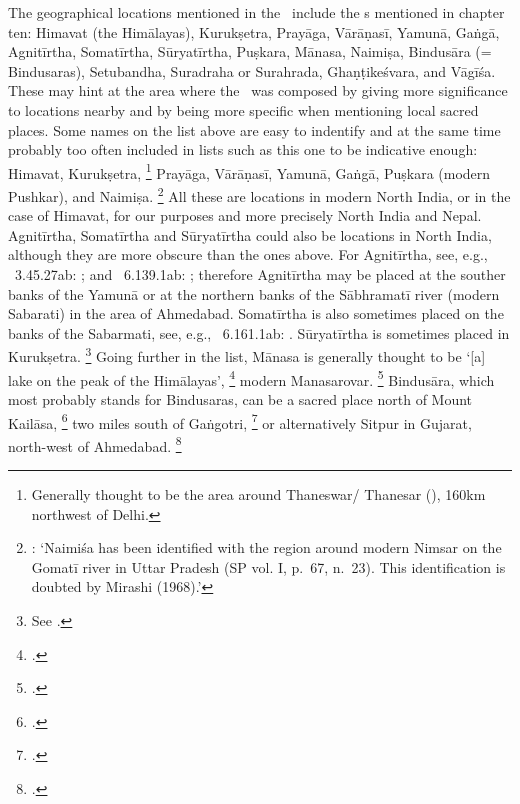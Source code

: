 The geographical locations 
mentioned in the \VSS\ include the
s mentioned in chapter ten:
Himavat (the Himālayas),
Kurukṣetra,
Prayāga,
Vārāṇasī,
Yamunā,
Gaṅgā,
Agnitīrtha, %
Somatīrtha, %
Sūryatīrtha, %
Puṣkara, %
Mānasa, %
Naimiṣa, %
Bindusāra (= Bindusaras), %
Setubandha, %
Suradraha or Sura\-hrada, %
Ghaṇṭikeśvara,
and Vāgīśa.
These may hint at the area where the \VSS\ was
composed by giving more significance to 
locations nearby and by being more specific when
mentioning local sacred places.
Some names on the list above are 
easy to indentify and at the same
time probably too often included in lists such as this one
to be indicative enough: 
Himavat, Kurukṣetra,%
	\footnote{Generally thought to be the area
		around Thaneswar\thinspace /\thinspace
		Thanesar (), 
		160km northwest of Delhi.}	
Prayāga, Vārāṇasī, Yamunā,
Gaṅgā, Puṣkara (modern Pushkar), and Naimiṣa.%
		\footnote{: 
		`Naimiśa has been identified with the region around 
		modern Nimsar on the Gomatī river in Uttar Pradesh 			(SP vol. I, p.~67, n.~23). 
		This identification is doubted by Mirashi (1968).'}
All these are locations in modern North India, or in the case of Himavat, for our purposes and 
more precisely North India and Nepal.
Agnitīrtha, Somatīrtha and Sūryatīrtha could also
be locations in North India, although they are
more obscure than the ones above.
For Agnitīrtha, see, e.g., \PadmaP\ 3.45.27ab:      
; and  
\PadmaP\  6.139.1ab:    
; 
therefore Agnitīrtha may be placed at the souther
banks of the Yamunā or at the northern banks of
the Sābhramatī river (modern Sabarati) in the area of
Ahmedabad.
Somatīrtha is also sometimes placed on the banks
of the Sabarmati, see, e.g., \PadmaP\  6.161.1ab:        .
Sūryatīrtha is sometimes placed in Kurukṣetra.%
		\footnote{See 
		.}
Going further in the list, Mānasa is generally thought
to be `[a] lake on the peak of the Himālayas',%
	\footnote{.}
modern Manasarovar.%
	\footnote{.} 
Bindusāra, which most probably stands for
Bindusaras, can be a sacred place north of Mount
Kailāsa,%
	\footnote{.}
two miles south of Gaṅgotri,%
	\footnote{.}
or alternatively Sitpur in Gujarat, north-west of 
Ahmedabad.%
	\footnote{.}
	
